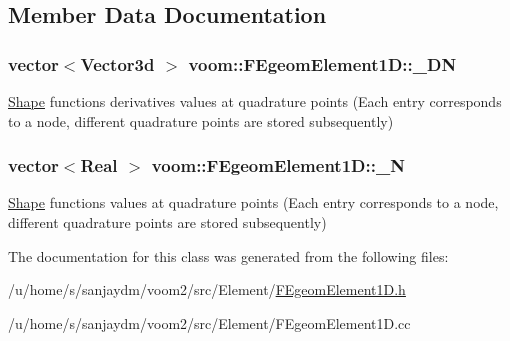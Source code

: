 \subsection{Member Data Documentation}
\hypertarget{classvoom_1_1_f_egeom_element1_d_ac24d6f4aa2a37ac19e703b1af4053d17}{
\subsubsection[{\_\-DN}]{\setlength{\rightskip}{0pt plus 5cm}vector$<$Vector3d $>$ {\bf voom::FEgeomElement1D::\_\-DN}}}
\label{classvoom_1_1_f_egeom_element1_d_ac24d6f4aa2a37ac19e703b1af4053d17}
\hyperlink{classvoom_1_1_shape}{Shape} functions derivatives values at quadrature points (Each entry corresponds to a node, different quadrature points are stored subsequently) \hypertarget{classvoom_1_1_f_egeom_element1_d_a3fdff0f1167383a0aaddad60100debe7}{
\subsubsection[{\_\-N}]{\setlength{\rightskip}{0pt plus 5cm}vector$<$Real $>$ {\bf voom::FEgeomElement1D::\_\-N}}}
\label{classvoom_1_1_f_egeom_element1_d_a3fdff0f1167383a0aaddad60100debe7}
\hyperlink{classvoom_1_1_shape}{Shape} functions values at quadrature points (Each entry corresponds to a node, different quadrature points are stored subsequently) 

The documentation for this class was generated from the following files:\begin{DoxyCompactItemize}
\item 
/u/home/s/sanjaydm/voom2/src/Element/\hyperlink{_f_egeom_element1_d_8h}{FEgeomElement1D.h}\item 
/u/home/s/sanjaydm/voom2/src/Element/FEgeomElement1D.cc\end{DoxyCompactItemize}
